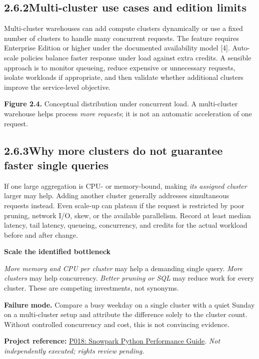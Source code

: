 \documentclass[11pt,twoside]{article}
\newcommand{\topic}[2]{\subsection*{#1\quad #2}}
\newcommand{\repo}[2]{\par\begingroup\fontsize{8.0}{9.6}\selectfont\sffamily\color{inkgray}\textbf{Project reference:} \href{#2}{#1}. \textit{Not independently executed; rights review pending.}\par\endgroup}
\begin{document}
\topic{2.6.2}{Multi-cluster use cases and edition limits}
Multi-cluster warehouses can add compute clusters dynamically or use a fixed number of clusters to handle many concurrent requests. The feature requires Enterprise Edition or higher under the documented availability model [4]. Auto-scale policies balance faster response under load against extra credits. A sensible approach is to monitor queueing, reduce expensive or unnecessary requests, isolate workloads if appropriate, and then validate whether additional clusters improve the service-level objective.

\begin{center}
\end{center}
{\small\color{inkgray}\textbf{Figure 2.4.} Conceptual distribution under concurrent load. A multi-cluster warehouse helps process \emph{more requests}; it is not an automatic acceleration of one request.}\par

\topic{2.6.3}{Why more clusters do not guarantee faster single queries}
If one large aggregation is CPU- or memory-bound, making \emph{its assigned cluster} larger may help. Adding another cluster generally addresses simultaneous requests instead. Even scale-up can plateau if the request is restricted by poor pruning, network I/O, skew, or the available parallelism. Record at least median latency, tail latency, queueing, concurrency, and credits for the actual workload before and after change.

\begin{insight}
\textbf{Scale the identified bottleneck}\par
\emph{More memory and CPU per cluster} may help a demanding single query. \emph{More clusters} may help concurrency. \emph{Better pruning or SQL} may reduce work for every cluster. These are competing investments, not synonyms.
\end{insight}
\textbf{Failure mode.} Compare a busy weekday on a single cluster with a quiet Sunday on a multi-cluster setup and attribute the difference solely to the cluster count. Without controlled concurrency and cost, this is not convincing evidence.
\repo{P018: Snowpark Python Performance Guide}{https://github.com/Snowflake-Labs/sfguide-snowpark-python-top-three-tips-for-optimal-performance}
\end{document}
